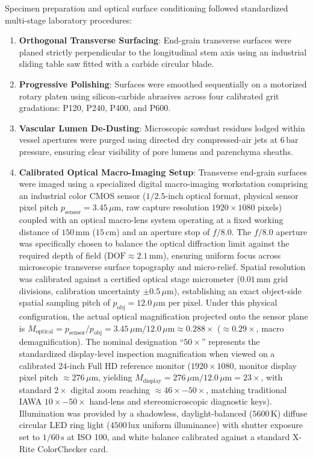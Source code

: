 \documentclass[a4paper,fleqn,12pt]{cas-sc}
\begin{document}
Specimen preparation and optical surface conditioning followed standardized multi-stage laboratory procedures:
\begin{enumerate}[leftmargin=*,itemsep=2pt,topsep=2pt]
    \item \textbf{Orthogonal Transverse Surfacing}: End-grain transverse surfaces were planed strictly perpendicular to the longitudinal stem axis using an industrial sliding table saw fitted with a carbide circular blade.
    \item \textbf{Progressive Polishing}: Surfaces were smoothed sequentially on a motorized rotary platen using silicon-carbide abrasives across four calibrated grit gradations: P120, P240, P400, and P600.
    \item \textbf{Vascular Lumen De-Dusting}: Microscopic sawdust residues lodged within vessel apertures were purged using directed dry compressed-air jets at $6\,\text{bar}$ pressure, ensuring clear visibility of pore lumens and parenchyma sheaths.
    \item \textbf{Calibrated Optical Macro-Imaging Setup}: Transverse end-grain surfaces were imaged using a specialized digital macro-imaging workstation comprising an industrial color CMOS sensor ($1/2.5$-inch optical format, physical sensor pixel pitch $p_{\text{sensor}} = 3.45\,\mu\text{m}$, raw capture resolution $1920 \times 1080$ pixels) coupled with an optical macro-lens system operating at a fixed working distance of $150\,\text{mm}$ ($15\,\text{cm}$) and an aperture stop of $f/8.0$. The $f/8.0$ aperture was specifically chosen to balance the optical diffraction limit against the required depth of field ($\text{DOF} \approx 2.1\,\text{mm}$), ensuring uniform focus across microscopic transverse surface topography and micro-relief. Spatial resolution was calibrated against a certified optical stage micrometer ($0.01\,\text{mm}$ grid divisions, calibration uncertainty $\pm 0.5\,\mu\text{m}$), establishing an exact object-side spatial sampling pitch of $p_{\text{obj}} = 12.0\,\mu\text{m}$ per pixel. Under this physical configuration, the actual optical magnification projected onto the sensor plane is $M_{\text{optical}} = p_{\text{sensor}} / p_{\text{obj}} = 3.45\,\mu\text{m} / 12.0\,\mu\text{m} \approx 0.288\times$ ($\approx 0.29\times$, macro demagnification). The nominal designation ``$50\times$'' represents the standardized display-level inspection magnification when viewed on a calibrated 24-inch Full HD reference monitor ($1920 \times 1080$, monitor display pixel pitch $\approx 276\,\mu\text{m}$, yielding $M_{\text{display}} = 276\,\mu\text{m} / 12.0\,\mu\text{m} = 23\times$, with standard $2\times$ digital zoom reaching $\approx 46\times - 50\times$, matching traditional IAWA $10\times - 50\times$ hand-lens and stereomicroscopic diagnostic keys). Illumination was provided by a shadowless, daylight-balanced ($5600\,\text{K}$) diffuse circular LED ring light ($4500\,\text{lux}$ uniform illuminance) with shutter exposure set to $1/60\,\text{s}$ at ISO 100, and white balance calibrated against a standard X-Rite ColorChecker card.

\end{enumerate}
\end{document}
